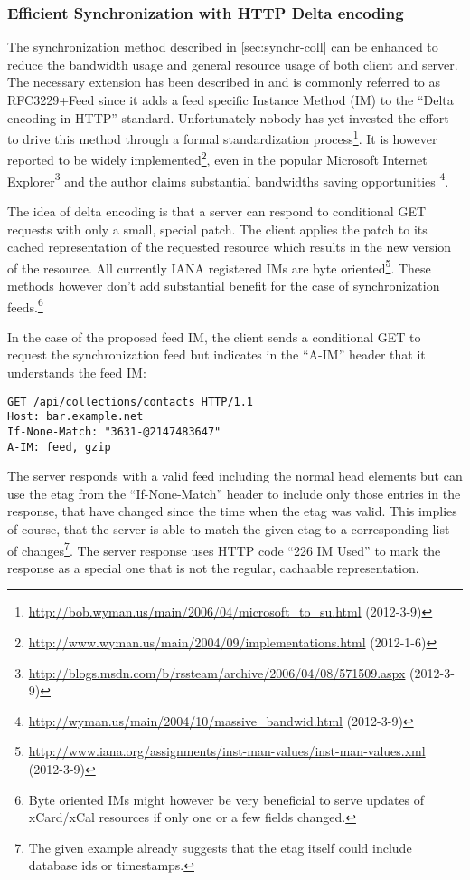 \documentclass[12pt,a4paper,twoside]{scrartcl}		%
\newcommand{\citeurl}[2]{\url{#1} (#2)}
\begin{document}
\subsubsection{Efficient Synchronization with HTTP Delta encoding}
\label{sec:effic-synchr-with}

The synchronization method described in \autoref{sec:synchr-coll} can be
enhanced to reduce the bandwidth usage and general resource usage of both client
and server. The necessary extension has been described in \cite{Wyman2004} and
is commonly referred to as RFC3229+Feed since it adds a feed specific Instance
Method (IM) to the ``Delta encoding in HTTP''
standard\cite{RFC3229}. Unfortunately nobody has yet invested the effort to
drive this method through a formal standardization
process\footnote{\citeurl{http://bob.wyman.us/main/2006/04/microsoft_to_su.html}{2012-3-9}}. It
is however reported to be widely
implemented\footnote{\citeurl{http://www.wyman.us/main/2004/09/implementations.html}{2012-1-6}},
even in the popular Microsoft Internet
Explorer\footnote{\citeurl{http://blogs.msdn.com/b/rssteam/archive/2006/04/08/571509.aspx}{2012-3-9}}
and the author claims substantial bandwidths saving opportunities
\footnote{\citeurl{http://wyman.us/main/2004/10/massive_bandwid.html}{2012-3-9}}.

The idea of delta encoding is that a server can respond to conditional GET
requests with only a small, special patch. The client applies the patch to its
cached representation of the requested resource which results in the new version
of the resource. All currently IANA registered IMs are byte
oriented\footnote{\citeurl{http://www.iana.org/assignments/inst-man-values/inst-man-values.xml}{2012-3-9}}. These
methods however don't add substantial benefit for the case of synchronization
feeds.\footnote{Byte oriented IMs might however be very beneficial to serve
  updates of xCard/xCal resources if only one or a few fields changed.}

In the case of the proposed feed IM, the client sends a conditional GET to
request the synchronization feed but indicates in the ``A-IM'' header that it
understands the feed IM:
\begin{lstlisting}
GET /api/collections/contacts HTTP/1.1
Host: bar.example.net
If-None-Match: "3631-@2147483647"
A-IM: feed, gzip
\end{lstlisting}
The server responds with a valid feed including the normal head elements but can
use the etag from the ``If-None-Match'' header to include only those entries in
the response, that have changed since the time when the etag was valid. This
implies of course, that the server is able to match the given etag to a
corresponding list of changes\footnote{The given example already suggests that
  the etag itself could include database ids or timestamps.}. The server
response uses HTTP code ``226 IM Used''\cite{RFC3229} to mark the response as a
special one that is not the regular, cachaable representation.
\end{document}
